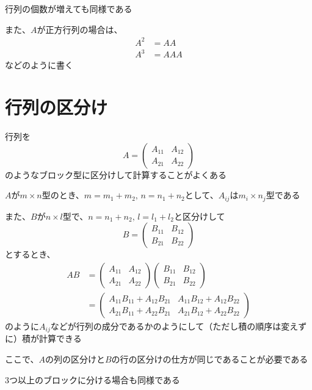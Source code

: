 \documentclass[../../../topic_linear-algebra]{subfiles}
\begin{document}
行列の個数が増えても同様である

\br

また、$A$が正方行列の場合は、
\begin{align*}
  A^2 & = AA  \\
  A^3 & = AAA
\end{align*}
などのように書く

\sectionline
\section{行列の区分け}

行列を
\begin{equation*}
  A = \begin{pmatrix}
    A_{11} & A_{12} \\
    A_{21} & A_{22}
  \end{pmatrix}
\end{equation*}
のようなブロック型に区分けして計算することがよくある

\br

$A$が$m \times n$型のとき、$m = m_1 + m_2, \, n = n_1 + n_2$として、$A_{ij}$は$m_i \times n_j$型である

\br

また、$B$が$n \times l$型で、$n = n_1 + n_2, \, l = l_1 + l_2$と区分けして
\begin{equation*}
  B = \begin{pmatrix}
    B_{11} & B_{12} \\
    B_{21} & B_{22}
  \end{pmatrix}
\end{equation*}
とするとき、
\begin{align*}
  AB & = \begin{pmatrix}
           A_{11} & A_{12} \\
           A_{21} & A_{22}
         \end{pmatrix} \begin{pmatrix}
                         B_{11} & B_{12} \\
                         B_{21} & B_{22}
                       \end{pmatrix}                             \\
     & = \begin{pmatrix}
           A_{11}B_{11} + A_{12}B_{21} & A_{11}B_{12} + A_{12}B_{22} \\
           A_{21}B_{11} + A_{22}B_{21} & A_{21}B_{12} + A_{22}B_{22}
         \end{pmatrix}
\end{align*}
のように$A_{ij}$などが行列の成分であるかのようにして（ただし積の順序は変えずに）積が計算できる

ここで、$A$の列の区分けと$B$の行の区分けの仕方が同じであることが必要である

\br

3つ以上のブロックに分ける場合も同様である
\end{document}
